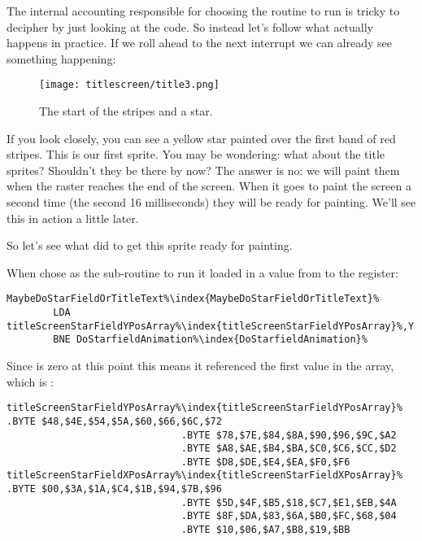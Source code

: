 The internal accounting responsible for choosing the routine to run is tricky to decipher by just looking at the code. So
instead let's follow what actually happens in practice. If we roll ahead to the next interrupt we can already see something
happening:

\begin{figure}[H]
    \centering
      \texttt{[image: titlescreen/title3.png]}%
\caption{The start of the stripes and a star.}
\end{figure}

If you look closely, you can see a yellow star painted over the first band of red stripes. This is our first sprite. You may
be wondering: what about the title sprites? Shouldn't they be there by now? The answer is no: we will paint them when the
raster reaches the end of the screen. When it goes to paint the screen a second time (the second 16 milliseconds) they
will be ready for painting. We'll see this in action a little later.

So let's see what  did to get this sprite ready for painting.

When  chose  as the sub-routine to run it loaded in a value
from  to the  register: 

\begin{lstlisting}[escapechar=\%]
MaybeDoStarFieldOrTitleText%\index{MaybeDoStarFieldOrTitleText}%   
        LDA titleScreenStarFieldYPosArray%\index{titleScreenStarFieldYPosArray}%,Y
        BNE DoStarfieldAnimation%\index{DoStarfieldAnimation}%
\end{lstlisting}

Since  is zero at this point this means it referenced the first value in the array, which is :
\begin{lstlisting}[basicstyle=\tiny,escapechar=\%]
titleScreenStarFieldYPosArray%\index{titleScreenStarFieldYPosArray}% .BYTE $48,$4E,$54,$5A,$60,$66,$6C,$72
                              .BYTE $78,$7E,$84,$8A,$90,$96,$9C,$A2
                              .BYTE $A8,$AE,$B4,$BA,$C0,$C6,$CC,$D2
                              .BYTE $D8,$DE,$E4,$EA,$F0,$F6
titleScreenStarFieldXPosArray%\index{titleScreenStarFieldXPosArray}% .BYTE $00,$3A,$1A,$C4,$1B,$94,$7B,$96
                              .BYTE $5D,$4F,$B5,$18,$C7,$E1,$EB,$4A
                              .BYTE $8F,$DA,$83,$6A,$B0,$FC,$68,$04
                              .BYTE $10,$06,$A7,$B8,$19,$BB
\end{lstlisting}

